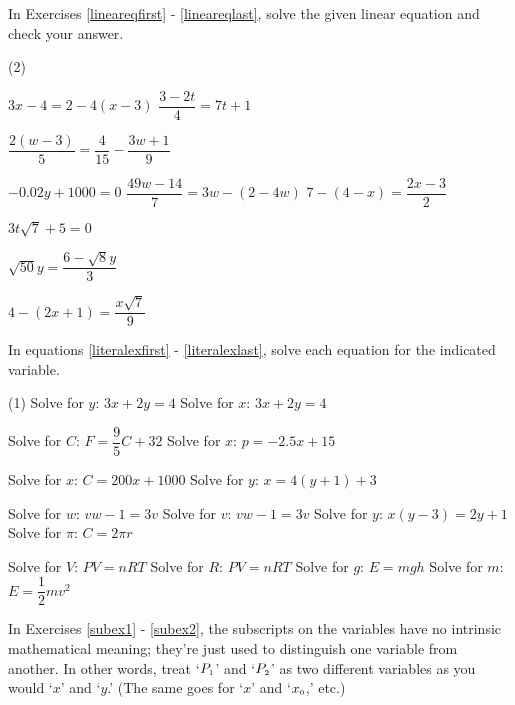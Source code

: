 \label{ExercisesforAppLinearEqIneq}

In Exercises \ref{lineareqfirst} - \ref{lineareqlast}, solve the given linear equation and check your answer.  


\begin{tasks}(2)

\task $3x - 4 = 2 - 4(x-3)$\label{lineareqfirst} 
\task $\dfrac{3 - 2t}{4} = 7t+1$

\task  $\dfrac{2(w-3)}{5} = \dfrac{4}{15} - \dfrac{3w+1}{9}$ 

\task  $-0.02y + 1000 = 0$  
\task  $\dfrac{49w - 14}{7}= 3w - (2-4w)$ 
\task  $7 - (4-x) = \dfrac{2x-3}{2}$  

\task $3 t\sqrt{7}  + 5 = 0$  

\task  $\sqrt{50} y = \dfrac{6 - \sqrt{8} y}{3}$  

\task  $4 - (2x+1) = \dfrac{x \sqrt{7}}{9}$ \label{lineareqlast} 
\end{tasks}

In equations \ref{literalexfirst} - \ref{literalexlast}, solve each equation for the indicated variable.

\begin{tasks}[resume](1)
\task  Solve for $y$:  $3x+2y = 4$  \label{literalexfirst}
\task  Solve for $x$:  $3x+2y = 4$ 

\task  Solve for $C$: $F = \dfrac{9}{5} C + 32$
\task  Solve for $x$:  $p = -2.5x + 15$ 

\task  Solve for $x$: $C = 200x + 1000$ 
\task  Solve for $y$:  $x= 4(y+1) + 3$ 

\task  Solve for $w$:  $vw - 1 = 3v$ 
\task  Solve for $v$:   $vw - 1 = 3v$
\task Solve for $y$:  $x(y-3) = 2y+1$
\task Solve for $\pi$:  $C = 2\pi r$

\task Solve for $V$:   $PV = nRT$
\task Solve for $R$:  $PV = nRT$
\task Solve for $g$:   $E = mgh$ 
\task Solve for $m$:  $E = \dfrac{1}{2} mv^2$
\end{tasks}

In Exercises \ref{subex1} - \ref{subex2}, the subscripts on the variables have no intrinsic mathematical meaning; they're just used to distinguish one variable from another.  In other words, treat `$P_{\text{\tiny $1$}}$' and `$P_{\text{\tiny $2$}}$'  as two different variables as you would `$x$' and `$y$.'  (The same goes for `$x$' and `$x_{\text{\tiny $0$}}$,'  etc.)

